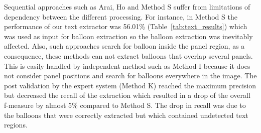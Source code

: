 
Sequential approaches such as Arai, Ho and Method S suffer from limitations of dependency between the different processing.
For instance, in Method S the performance of our text extractor was 56.01\% (Table~\ref{tab:text_results}) which was used as input for balloon extraction so the balloon extraction was inevitably affected.
Also, such approaches search for balloon inside the panel region, as a consequence, these methods can not extract balloons that overlap several panels.
This is easily handled by independent method such as Method I because it does not consider panel positions and search for balloons everywhere in the image.
The post validation by the expert system (Method K) reached the maximum precision but decreased the recall of the extraction which resulted in a drop of the overall f-measure by almost 5\% compared to Method S.
The drop in recall was due to the balloons that were correctly extracted but which contained undetected text regions.








